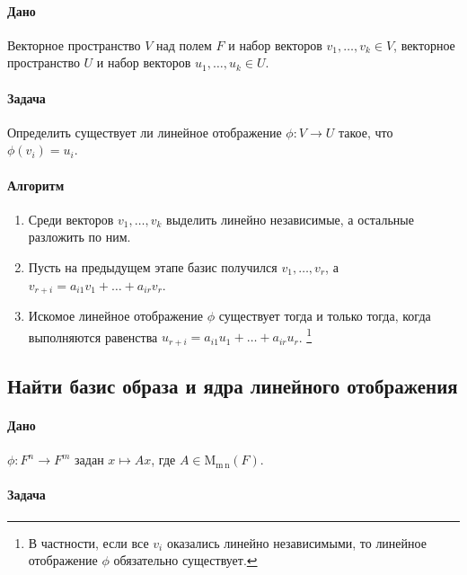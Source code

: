 \documentclass{article}
\newcommand{\MatrixDim}[3]{\operatorname{\mathrm{M}_{#2\,#3}}(#1)}
\begin{document}
\paragraph{Дано}

Векторное пространство $V$ над полем $F$ и набор векторов $v_1,\ldots,v_k\in V$, векторное пространство $U$ и набор векторов $u_1,\ldots,u_k\in U$.

\paragraph{Задача}

Определить существует ли линейное отображение $\phi\colon V\to U$ такое, что $\phi(v_i) = u_i$.

\paragraph{Алгоритм}

\begin{enumerate}
\item Среди векторов $v_1,\ldots,v_k$ выделить линейно независимые, а остальные разложить по ним.

\item Пусть на предыдущем этапе базис получился $v_1,\ldots,v_r$, а $v_{r + i} = a_{i1} v_1 + \ldots + a_{ir}v_r$.

\item Искомое линейное отображение $\phi$ существует тогда и только тогда, когда выполняются равенства $u_{r+i} = a_{i1}u_1 + \ldots + a_{ir}u_r$.%
\footnote{В частности, если все $v_i$ оказались линейно независимыми, то линейное отображение $\phi$ обязательно существует.}
\end{enumerate}

\subsection{Найти базис образа и ядра линейного отображения}

\paragraph{Дано}

$\phi\colon F^{n}\to F^{m}$ задан $x\mapsto Ax$, где $A\in\MatrixDim{F}{m}{n}$.

\paragraph{Задача}
\end{document}
